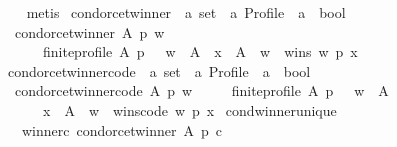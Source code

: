 \begin{isabellebody}
\ \ \isamarkupfalse%
\ metis%
\endisatagproof
{\isafoldproof}%
%
\isadelimproof
%
\endisadelimproof
%
\isadelimdocument
%
\endisadelimdocument
%
\isatagdocument
%
\isamarkuptrue%
%
\endisatagdocument
{\isafolddocument}%
%
\isadelimdocument
%
\endisadelimdocument
{}\isamarkupfalse%
\ condorcet{\isacharunderscore}{\kern0pt}winner\ {\isacharcolon}{\kern0pt}{\isacharcolon}{\kern0pt}\ {\isachardoublequoteopen}{\isacharprime}{\kern0pt}a\ set\ {\isasymRightarrow}\ {\isacharprime}{\kern0pt}a\ Profile\ {\isasymRightarrow}\ {\isacharprime}{\kern0pt}a\ {\isasymRightarrow}\ bool{\isachardoublequoteclose}\ \isanewline
\ \ {\isachardoublequoteopen}condorcet{\isacharunderscore}{\kern0pt}winner\ A\ p\ w\ {\isacharequal}{\kern0pt}\isanewline
\ \ \ \ \ \ {\isacharparenleft}{\kern0pt}finite{\isacharunderscore}{\kern0pt}profile\ A\ p\ {\isasymand}\ \ w\ {\isasymin}\ A\ {\isasymand}\ {\isacharparenleft}{\kern0pt}{\isasymforall}x\ {\isasymin}\ A\ {\isacharminus}{\kern0pt}\ {\isacharbraceleft}{\kern0pt}w{\isacharbraceright}{\kern0pt}\ {\isachardot}{\kern0pt}\ wins\ w\ p\ x{\isacharparenright}{\kern0pt}{\isacharparenright}{\kern0pt}{\isachardoublequoteclose}\isanewline
\isanewline
{}\isamarkupfalse%
\ condorcet{\isacharunderscore}{\kern0pt}winner{\isacharunderscore}{\kern0pt}code\ {\isacharcolon}{\kern0pt}{\isacharcolon}{\kern0pt}\ {\isachardoublequoteopen}{\isacharprime}{\kern0pt}a\ set\ {\isasymRightarrow}\ {\isacharprime}{\kern0pt}a\ Profile\ {\isasymRightarrow}\ {\isacharprime}{\kern0pt}a\ {\isasymRightarrow}\ bool{\isachardoublequoteclose}\ \isanewline
\ \ {\isachardoublequoteopen}condorcet{\isacharunderscore}{\kern0pt}winner{\isacharunderscore}{\kern0pt}code\ A\ p\ w\ {\isacharequal}{\kern0pt}\isanewline
\ \ \ \ {\isacharparenleft}{\kern0pt}finite{\isacharunderscore}{\kern0pt}profile\ A\ p\ {\isasymand}\ \ w\ {\isasymin}\ A\ {\isasymand}\isanewline
\ \ \ \ \ \ {\isacharparenleft}{\kern0pt}{\isasymforall}x\ {\isasymin}\ A\ {\isacharminus}{\kern0pt}\ {\isacharbraceleft}{\kern0pt}w{\isacharbraceright}{\kern0pt}\ {\isachardot}{\kern0pt}\ wins{\isacharunderscore}{\kern0pt}code\ w\ p\ x{\isacharparenright}{\kern0pt}{\isacharparenright}{\kern0pt}{\isachardoublequoteclose}\isanewline
\isanewline
{}\isamarkupfalse%
\ cond{\isacharunderscore}{\kern0pt}winner{\isacharunderscore}{\kern0pt}unique{\isacharcolon}{\kern0pt}\isanewline
\ \ \ winner{\isacharunderscore}{\kern0pt}c{\isacharcolon}{\kern0pt}\ {\isachardoublequoteopen}condorcet{\isacharunderscore}{\kern0pt}winner\ A\ p\ c{\isachardoublequoteclose}\ \isanewline

\end{isabellebody}
